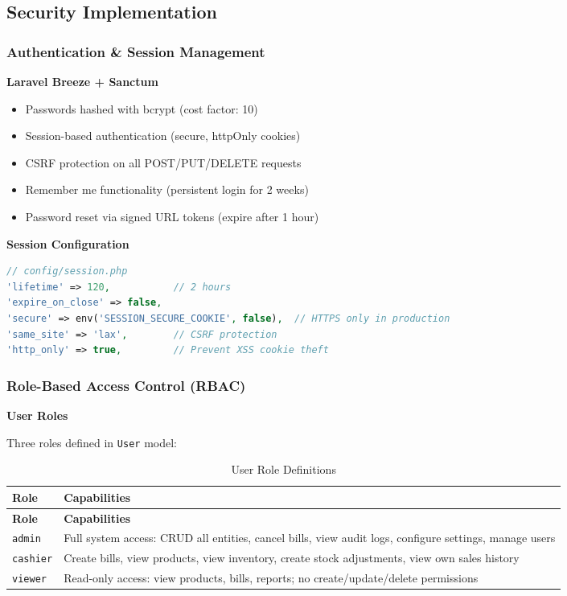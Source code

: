 \subsection{Security Implementation}

\subsubsection{Authentication \& Session Management}

\textbf{Laravel Breeze + Sanctum}

\begin{itemize}
    \item Passwords hashed with bcrypt (cost factor: 10)
    \item Session-based authentication (secure, httpOnly cookies)
    \item CSRF protection on all POST/PUT/DELETE requests
    \item Remember me functionality (persistent login for 2 weeks)
    \item Password reset via signed URL tokens (expire after 1 hour)
\end{itemize}

\textbf{Session Configuration}

\begin{lstlisting}[language=PHP,label=lst:session-config]
// config/session.php
'lifetime' => 120,           // 2 hours
'expire_on_close' => false,
'secure' => env('SESSION_SECURE_COOKIE', false),  // HTTPS only in production
'same_site' => 'lax',        // CSRF protection
'http_only' => true,         // Prevent XSS cookie theft
\end{lstlisting}

\subsubsection{Role-Based Access Control (RBAC)}

\textbf{User Roles}

Three roles defined in \texttt{User} model:

\begin{center}
\begin{longtable}{@{}p{2.5cm}p{10cm}@{}}
\caption{User Role Definitions}\\
\toprule
\textbf{Role} & \textbf{Capabilities} \\
\midrule
\endfirsthead
\toprule
\textbf{Role} & \textbf{Capabilities} \\
\midrule
\endhead
\bottomrule
\endlastfoot
\texttt{admin} & Full system access: CRUD all entities, cancel bills, view audit logs, configure settings, manage users \\
\texttt{cashier} & Create bills, view products, view inventory, create stock adjustments, view own sales history \\
\texttt{viewer} & Read-only access: view products, bills, reports; no create/update/delete permissions \\
\end{longtable}
\end{center}

